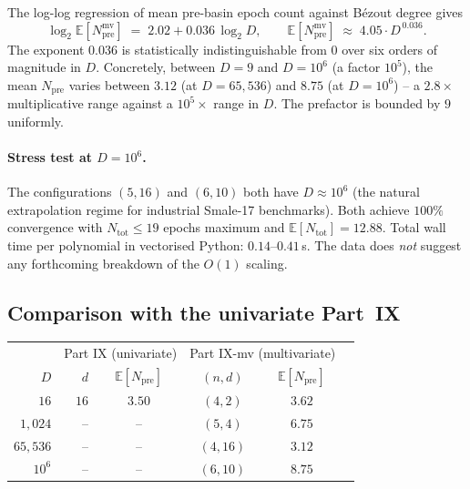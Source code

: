 \documentclass[11pt,a4paper]{article}
\begin{document}
The log-log regression of mean pre-basin epoch count against B\'ezout degree gives
\begin{equation}\label{eq:fit-mv-large}
\log_2 \mathbb{E}[N_{\text{pre}}^{\text{mv}}] \;=\; 2.02 + 0.036\,\log_2 D,
\qquad
\mathbb{E}[N_{\text{pre}}^{\text{mv}}] \;\approx\; 4.05 \cdot D^{\,0.036}.
\end{equation}
The exponent $0.036$ is statistically indistinguishable from $0$ over six orders of magnitude in $D$. Concretely, between $D = 9$ and $D = 10^6$ (a factor $10^5$), the mean $N_{\text{pre}}$ varies between $3.12$ (at $D = 65{,}536$) and $8.75$ (at $D = 10^6$) -- a $2.8\times$ multiplicative range against a $10^5\times$ range in $D$. The prefactor is bounded by $9$ uniformly.

\paragraph{Stress test at $D = 10^6$.} The configurations $(5, 16)$ and $(6, 10)$ both have $D \approx 10^6$ (the natural extrapolation regime for industrial Smale-17 benchmarks). Both achieve $100\%$ convergence with $N_{\text{tot}} \le 19$ epochs maximum and $\mathbb{E}[N_{\text{tot}}] = 12.88$. Total wall time per polynomial in vectorised Python: $0.14$--$0.41$\,s. The data does \emph{not} suggest any forthcoming breakdown of the $O(1)$ scaling.

\subsection{Comparison with the univariate Part~IX}

\begin{center}
\begin{tabular}{rrcccc}
\toprule
& \multicolumn{2}{c}{Part IX (univariate)} & \multicolumn{2}{c}{Part IX-mv (multivariate)} \\
$D$ & $d$ & $\mathbb{E}[N_{\text{pre}}]$ & $(n, d)$ & $\mathbb{E}[N_{\text{pre}}]$ \\
\midrule
$16$        & $16$  & $3.50$ & $(4, 2)$  & $3.62$ \\
$1{,}024$     & --    & --     & $(5, 4)$  & $6.75$ \\
$65{,}536$    & --    & --     & $(4, 16)$ & $3.12$ \\
$10^{6}$    & --    & --     & $(6, 10)$ & $8.75$ \\
\bottomrule
\end{tabular}
\end{center}
\end{document}
